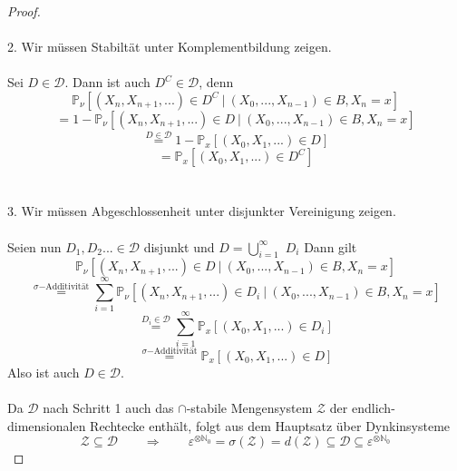 \documentclass[a4paper,12pt]{scrartcl}
\theoremstyle{definition}
\begin{document}
\begin{proof}
\\
\\
2. Wir müssen Stabiltät unter Komplementbildung zeigen.
\\
\\
Sei $D \in \mathcal{D}$. Dann ist auch $D^{C} \in \mathcal{D}$, denn
\begin{equation*}
\mathbb{P}_{\nu}[(X_{n},X_{n+1},...) \in D^{C} \: | \: (X_{0},...,X_{n-1})  \in B, X_{n} = x]
\end{equation*}
\begin{equation*}
= 1 - \mathbb{P}_{\nu}[(X_{n},X_{n+1},...) \in D \: | \: (X_{0},...,X_{n-1})  \in B, X_{n} = x]
\end{equation*}
\begin{equation*}
\stackrel{D \in \mathcal{D}}{=} 1 - \mathbb{P}_{x}[(X_{0},X_{1},...) \in D]
\end{equation*}
\begin{equation*}
= \mathbb{P}_{x}[(X_{0},X_{1},...) \in D^{C}]
\end{equation*}
\\
\\
3. Wir müssen Abgeschlossenheit unter disjunkter Vereinigung zeigen.
\\
\\
Seien nun $D_{1},D_{2}... \in \mathcal{D}$ disjunkt und $D = \bigcup_{i=1}^{\infty} $ $D_{i}$ Dann gilt
\begin{equation*}
\mathbb{P}_{\nu}[(X_{n},X_{n+1},...) \in D \: | \: (X_{0},...,X_{n-1})  \in B, X_{n} = x]
\end{equation*}
\begin{equation*}
\stackrel{\sigma \mathrm{-Additivität}}{=}  \sum_{i=1}^{\infty} \mathbb{P}_{\nu}[(X_{n},X_{n+1},...) \in D_{i} \: | \: (X_{0},...,X_{n-1})  \in B, X_{n} = x]
\end{equation*}
\begin{equation*}
\stackrel{D_{i} \in \mathcal{D}}{=} \sum_{i=1}^{\infty} \mathbb{P}_{x}[(X_{0},X_{1},...) \in D_{i}]
\end{equation*}
\begin{equation*}
\stackrel{\sigma \mathrm{-Additivität}}{=} \mathbb{P}_{x}[(X_{0},X_{1},...) \in D]
\end{equation*}
Also ist auch $D \in \mathcal{D}$.
\\
\\ 
Da $\mathcal{D}$ nach Schritt 1 auch das $\cap$-stabile Mengensystem $\mathcal{Z}$ der endlich-dimensionalen Rechtecke enthält, folgt aus dem Hauptsatz über Dynkinsysteme  
\begin{equation*}
\mathcal{Z} \subseteq \mathcal{D} \qquad \Rightarrow \qquad \varepsilon^{ \otimes \mathbb{N}_{0}} = \sigma(\mathcal{Z}) = d(\mathcal{Z}) \subseteq \mathcal{D} \subseteq \varepsilon^{ \otimes \mathbb{N}_{0}}
\end{equation*}
\end{proof}
\end{document}
